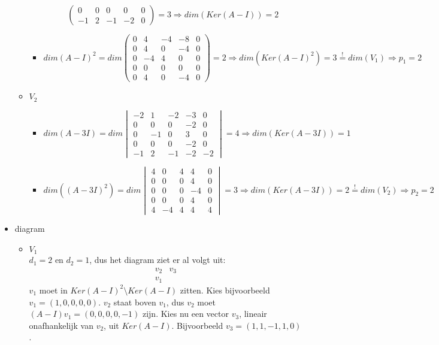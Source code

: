 \documentclass[main.tex]{subfiles}
\begin{document}
\begin{itemize}
\begin{itemize}
\begin{itemize}
\[\begin{pmatrix}
        0 & 0 & 0 & 0 & 0\\
        -1 & 2 & -1 & -2 & 0
      \end{pmatrix}
      = 3 \Rightarrow dim(Ker(A-I)) = 2
      \]
    \item
      \[ dim(A-I)^{2} = dim
      \begin{pmatrix}
        0 & 4 & -4 & -8 & 0\\
        0 & 4 & 0 & -4 & 0\\
        0 & -4 & 4 & 0 & 0\\
        0 & 0 & 0 & 0 & 0\\
        0 & 4 & 0 & -4 & 0
      \end{pmatrix}
      = 2 \Rightarrow dim(Ker(A-I)^{2}) = 3 \overset{!}{=} dim(V_{1})
      \Rightarrow p_{1} = 2
      \]
    \end{itemize}
  \item $V_{2}$
    \begin{itemize}
    \item
      \[
      dim(A-3I) = dim
      \begin{vmatrix}
        -2 & 1 & -2 & -3 & 0\\
        0 & 0 & 0  & -2 & 0\\
        0 & -1 & 0 & 3 & 0\\
        0 & 0 & 0 & -2 & 0\\
        -1 & 2 & -1 & -2 & -2
      \end{vmatrix}
      =  4 \Rightarrow dim(Ker(A-3I)) = 1
      \]
    \item 
      \[ 
      dim((A-3I)^{2}) = dim
      \begin{vmatrix}
        4 & 0 & 4 & 4 & 0\\
        0 & 0 & 0 & 4 & 0\\
        0 & 0 & 0 & -4& 0\\
        0 & 0 & 0 & 4 & 0\\
        4 & -4 & 4 & 4 & 4
      \end{vmatrix}
      = 3 \Rightarrow dim(Ker(A-3I)) = 2 \overset{!}{=} dim(V_{2}) \Rightarrow p_{2} = 2
      \]
    \end{itemize}
  \end{itemize}
\item diagram
  \begin{itemize}
  \item $V_{1}$\\
    $d_{1} = 2$ en $d_{2} = 1$, dus het diagram ziet er al volgt uit:
    \[
    \begin{array}{cc}
      \boxed{v_{2}} & \boxed{v_{3}}\\
      \boxed{v_{1}}
    \end{array}
    \] 
    $v_{1}$ moet in $Ker(A-I)^{2}\setminus Ker(A-I)$ zitten.
    Kies bijvoorbeeld $v_{1} = (1,0,0,0,0)$.
    $v_{2}$ staat boven $v_{1}$, dus $v_{2}$ moet $(A-I)v_{1}= (0,0,0,0,-1)$ zijn.
    Kies nu een vector $v_{3}$, lineair onafhankelijk van $v_{2}$, uit $Ker(A-I)$.
    Bijvoorbeeld $v_{3} = (1,1,-1,1,0)$.
    

\end{itemize}
\end{itemize}
\end{document}
